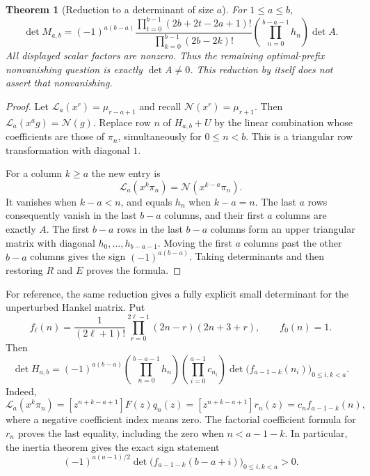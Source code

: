 \documentclass[11pt,a4paper]{article}
\numberwithin{equation}{section}
\theoremstyle{plain}
\newtheorem{theorem}{Theorem}[section]
\theoremstyle{definition}
\theoremstyle{remark}
\begin{document}
\begin{theorem}[Reduction to a determinant of size $a$]
\label{thm:general-small-determinant}
For $1\leq a\leq b$,
\begin{equation}\label{eq:general-small-det}
 \det M_{a,b}=
 (-1)^{a(b-a)}
 \frac{\prod_{t=0}^{b-1}(2b+2t-2a+1)!}
      {\prod_{k=0}^{b-1}(2b-2k)!}
 \left(\prod_{n=0}^{b-a-1}h_n\right)\det A.
\end{equation}
All displayed scalar factors are nonzero.  Thus the remaining
optimal-prefix nonvanishing question is exactly $\det A\ne0$.
This reduction by itself does not assert that nonvanishing.
\end{theorem}

\begin{proof}
Let $\mathcal L_a(x^r)=\mu_{r-a+1}$ and recall
$\mathcal N(x^r)=\mu_{r+1}$.  Then
$\mathcal L_a(x^ag)=\mathcal N(g)$.  Replace row $n$ of
$H_{a,b}+U$ by the linear combination whose coefficients are those
of $\pi_n$, simultaneously for $0\leq n<b$.  This is a triangular
row transformation with diagonal $1$.

For a column $k\geq a$ the new entry is
\[
 \mathcal L_a(x^k\pi_n)=\mathcal N(x^{k-a}\pi_n).
\]
It vanishes when $k-a<n$, and equals $h_n$ when $k-a=n$.
The last $a$ rows consequently vanish in the last $b-a$ columns,
and their first $a$ columns are exactly $A$.  The first $b-a$ rows
in the last $b-a$ columns form an upper triangular matrix with
diagonal $h_0,\ldots,h_{b-a-1}$.  Moving the first $a$ columns past
the other $b-a$ columns gives the sign $(-1)^{a(b-a)}$.
Taking determinants and then restoring $R$ and $E$ proves the formula.
\end{proof}

For reference, the same reduction gives a fully explicit
small determinant for the unperturbed Hankel matrix.  Put
\[
 f_\ell(n)=\frac1{(2\ell+1)!}
 \prod_{r=0}^{2\ell-1}(2n-r)(2n+3+r),\qquad f_0(n)=1.
\]
Then
\begin{equation}\label{eq:general-H-small-det}
 \det H_{a,b}=(-1)^{a(b-a)}
 \left(\prod_{n=0}^{b-a-1}h_n\right)
 \left(\prod_{i=0}^{a-1}c_{n_i}\right)
 \det\bigl(f_{a-1-k}(n_i)\bigr)_{0\leq i,k<a}.
\end{equation}
Indeed,
\[
 \mathcal L_a(x^k\pi_n)
 =[z^{n+k-a+1}]F(z)q_n(z)
 =[z^{n+k-a+1}]r_n(z)
 =c_n f_{a-1-k}(n),
\]
where a negative coefficient index means zero.  The factorial
coefficient formula for $r_n$ proves the last equality, including
the zero when $n<a-1-k$.  In particular, the inertia theorem gives
the exact sign statement
\[
 (-1)^{a(a-1)/2}
 \det\bigl(f_{a-1-k}(b-a+i)\bigr)_{0\leq i,k<a}>0.
\]
\end{document}
